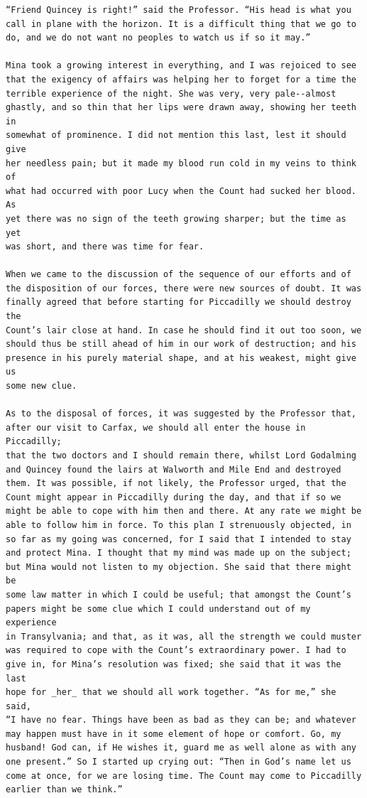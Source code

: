 \documentclass{article}
\begin{document}
\begin{verbatim}
“Friend Quincey is right!” said the Professor. “His head is what you
call in plane with the horizon. It is a difficult thing that we go to
do, and we do not want no peoples to watch us if so it may.”

Mina took a growing interest in everything, and I was rejoiced to see
that the exigency of affairs was helping her to forget for a time the
terrible experience of the night. She was very, very pale--almost
ghastly, and so thin that her lips were drawn away, showing her teeth in
somewhat of prominence. I did not mention this last, lest it should give
her needless pain; but it made my blood run cold in my veins to think of
what had occurred with poor Lucy when the Count had sucked her blood. As
yet there was no sign of the teeth growing sharper; but the time as yet
was short, and there was time for fear.

When we came to the discussion of the sequence of our efforts and of
the disposition of our forces, there were new sources of doubt. It was
finally agreed that before starting for Piccadilly we should destroy the
Count’s lair close at hand. In case he should find it out too soon, we
should thus be still ahead of him in our work of destruction; and his
presence in his purely material shape, and at his weakest, might give us
some new clue.

As to the disposal of forces, it was suggested by the Professor that,
after our visit to Carfax, we should all enter the house in Piccadilly;
that the two doctors and I should remain there, whilst Lord Godalming
and Quincey found the lairs at Walworth and Mile End and destroyed
them. It was possible, if not likely, the Professor urged, that the
Count might appear in Piccadilly during the day, and that if so we
might be able to cope with him then and there. At any rate we might be
able to follow him in force. To this plan I strenuously objected, in
so far as my going was concerned, for I said that I intended to stay
and protect Mina. I thought that my mind was made up on the subject;
but Mina would not listen to my objection. She said that there might be
some law matter in which I could be useful; that amongst the Count’s
papers might be some clue which I could understand out of my experience
in Transylvania; and that, as it was, all the strength we could muster
was required to cope with the Count’s extraordinary power. I had to
give in, for Mina’s resolution was fixed; she said that it was the last
hope for _her_ that we should all work together. “As for me,” she said,
“I have no fear. Things have been as bad as they can be; and whatever
may happen must have in it some element of hope or comfort. Go, my
husband! God can, if He wishes it, guard me as well alone as with any
one present.” So I started up crying out: “Then in God’s name let us
come at once, for we are losing time. The Count may come to Piccadilly
earlier than we think.”


\end{verbatim}
\end{document}
